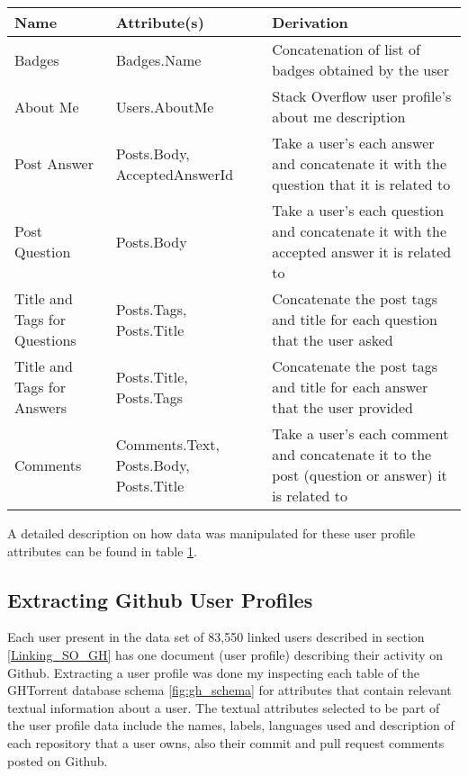         \begin{table}[!htbp]
            \centering
            \label{tab:SO_userProfileExtraction}
            \vspace{6pt} %
            \begin{tabular}{|p{3cm}|p{3cm}|p{8cm}|}
               \toprule
               \textbf{Name} & \textbf{Attribute(s)} & \textbf{Derivation} \\
               \toprule
                Badges & Badges.Name & Concatenation of list of badges obtained by the user \\
                About Me & Users.AboutMe & Stack Overflow user profile's about me description \\
                Post Answer & Posts.Body, AcceptedAnswerId & Take a user's each answer and concatenate it with the question that it is related to  \\
                Post Question & Posts.Body & Take a user's each question and concatenate it with the accepted answer it is related to  \\
                Title and Tags for Questions & Posts.Tags, Posts.Title & Concatenate the post tags and title for each question that the user asked \\
                Title and Tags for Answers & Posts.Title, Posts.Tags & Concatenate the post tags and title for each answer that the user provided \\
                Comments & Comments.Text, Posts.Body, Posts.Title & Take a user's each comment and concatenate it to the post (question or answer) it is related to \\
               \bottomrule
            \end{tabular}
        \end{table}  
        
       A detailed description on how data was manipulated for these user profile attributes can be found in table \ref{tab:SO_userProfileExtraction}.
    
        
    \subsection{Extracting Github User Profiles\label{GH_userProfileExtraction}}
        Each user present in the data set of 83,550 linked users described in section \ref{Linking_SO_GH} has one document (user profile) describing their activity on Github. Extracting a user profile was done my inspecting each table of the GHTorrent database schema \ref{fig:gh_schema} for attributes that contain relevant textual information about a user. The textual attributes selected to be part of the user profile data include the names, labels, languages used and description of each repository that a user owns, also their commit and pull request comments posted on Github. 
        
